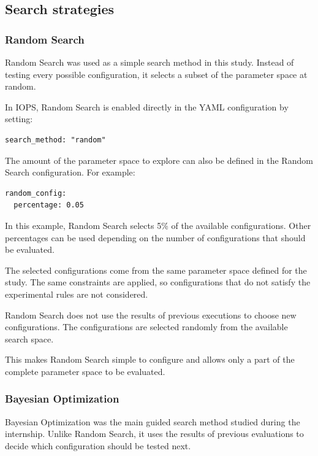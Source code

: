 \subsection{Search strategies}
    \subsubsection{Random Search}
\label{sec:random-search}

Random Search was used as a simple search method in this study. Instead
of testing every possible configuration, it selects a subset of the
parameter space at random.

In IOPS, Random Search is enabled directly in the YAML configuration by
setting:

\begin{verbatim}
search_method: "random"
\end{verbatim}

The amount of the parameter space to explore can also be defined in the
Random Search configuration. For example:

\begin{verbatim}
random_config:
  percentage: 0.05
\end{verbatim}

In this example, Random Search selects 5\% of the available
configurations. Other percentages can be used depending on the number of
configurations that should be evaluated.

The selected configurations come from the same parameter space defined
for the study. The same constraints are applied, so configurations that
do not satisfy the experimental rules are not considered.

Random Search does not use the results of previous executions to choose
new configurations. The configurations are selected randomly from the
available search space.

This makes Random Search simple to configure and allows only a part of
the complete parameter space to be evaluated.


\subsubsection{Bayesian Optimization}
\label{sec:bayesian-search}

Bayesian Optimization was the main guided search method studied during
the internship. Unlike Random Search, it uses the results of previous
evaluations to decide which configuration should be tested next.

